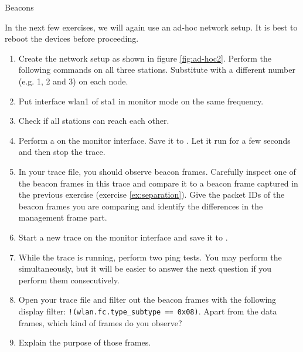 \begin{exercise}{Beacons}

In the next few exercises, we will again use an ad-hoc network setup. It is best to reboot the devices before proceeding.
\begin{enumerate}
	\item Create the network setup as shown in figure \ref{fig:ad-hoc2}. Perform the following commands on all three stations. Substitute  with a different number (e.g. 1, 2 and 3) on each node.\newline
	\item Put interface wlan1 of \ac{sta}1 in monitor mode on the same frequency.\newline
	\item Check if all stations can reach each other.
	\item Perform a  on the monitor interface. Save it to . Let it run for a few seconds and then stop the trace.
	\item In your trace file, you should observe beacon frames. Carefully inspect one of the beacon frames in this trace and compare it to a beacon frame captured in the previous exercise (exercise \ref{ex:separation}). Give the packet IDs of the beacon frames you are comparing and identify the differences in the management frame part.\newline
	\begin{esolution}
	\end{esolution}
	\item Start a new trace on the monitor interface and save it to .
	\item While the trace is running, perform two ping tests. You may perform the simultaneously, but it will be easier to answer the next question if you perform them consecutively.\newline
	\item Open your trace file and filter out the beacon frames with the following display filter: \verb#!(wlan.fc.type_subtype == 0x08)#. Apart from the data frames, which kind of frames do you observe?\newline
	\begin{esolution}
	\end{esolution}
	\item Explain the purpose of those frames.\newline
	\begin{esolution}
	\end{esolution}
\end{enumerate}
\end{exercise}

